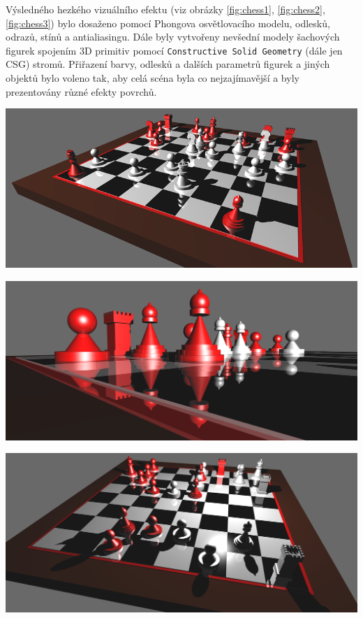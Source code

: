 \documentclass[12pt,a4paper,titlepage,final]{report}
\begin{document}
Výsledného hezkého vizuálního efektu (viz obrázky \ref{fig:chess1}, \ref{fig:chess2}, \ref{fig:chess3}) bylo dosaženo pomocí Phongova osvětlovacího modelu, odlesků, odrazů, stínů a antialiasingu. Dále byly vytvořeny nevšední modely šachových figurek spojením 3D primitiv pomocí \texttt{Constructive Solid Geometry} (dále jen CSG) stromů. Přiřazení barvy, odlesků a dalších parametrů figurek a jiných objektů bylo voleno tak, aby celá scéna byla co nejzajímavější a byly prezentovány různé efekty povrchů.

\begin{center}
	\captionsetup{type=figure}
		\includegraphics[width=0.8\linewidth]{images/scene1.png}
	\label{fig:chess1}
\end{center}

\begin{center}
	\captionsetup{type=figure}
	\includegraphics[width=0.8\linewidth]{images/scene2.png}
	\label{fig:chess2}
\end{center}

\begin{center}
	\captionsetup{type=figure}
	\includegraphics[width=0.8\linewidth]{images/scene3.png}
	\label{fig:chess3}
\end{center}
\end{document}
